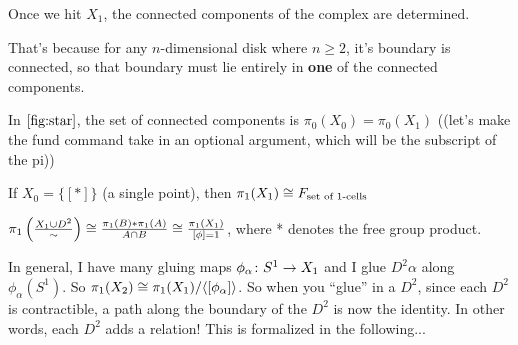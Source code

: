 \documentclass[11pt,leqno,oneside]{amsart}
\numberwithin{thm}{section}
\newcommand{\fund}[1][1]{\pi_{#1}}
\begin{document}
Once we hit $X_1$, the connected components of the complex are determined.

That's because for any $n$-dimensional disk where $n \geq 2$, it's boundary is connected, so that boundary must lie entirely in \textbf{one} of the connected components.

In $\ref{fig:star}$, the set of connected components is $\fund[0](X_0) = \fund[0](X_1)$ ((let's make the fund command take in an optional argument, which will be the subscript of the pi))

If $X_0 = \{[*]\}$ (a single point), then $\fund(X_1) \isom F_{\text{set of 1-cells}}$

$\fund\left( \frac{X_1 \union D^2}{\sim} \right) \isom \frac{\fund(B) * \fund(A)}{A \cap B} \isom \frac{\fund(X_1)}{[\phi] = 1}$, where * denotes the free group product.

In general, I have many gluing maps $\phi_\alpha\colon S^1 \to X_1$ and I glue $D^2\alpha$ along $\phi_\alpha(S^1)$.  So $\fund(X_2) \isom \fund(X_1)/\langle[\phi_\alpha]\rangle$.  So when you ``glue'' in a $D^2$, since each $D^2$ is contractible, a path along the boundary of the $D^2$ is now the identity. In other words, each $D^2$ adds a relation!  This is formalized in the following...
\end{document}
